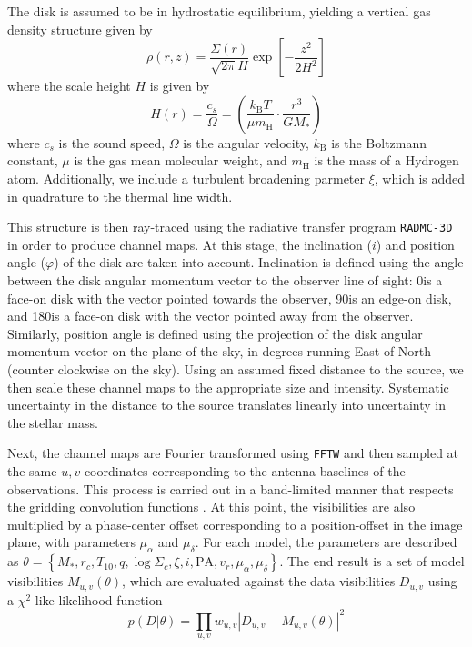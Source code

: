 \documentclass{aastex6}
\begin{document}
The disk is assumed to be in hydrostatic equilibrium, yielding a vertical gas density structure given by
\begin{equation}
\rho(r, z) = \frac{\Sigma(r)}{\sqrt{2 \pi} H} \exp \left [- \frac{z^2}{2 H^2} \right]
\end{equation}
where the scale height $H$ is given by
\begin{equation}
	H(r) = \frac{c_s}{\Omega} = \left (\frac{k_\mathrm{B} T}{\mu m_\mathrm{H}} \cdot \frac{r^3}{G M_\ast} \right)
\end{equation}
where $c_s$ is the sound speed, $\Omega$ is the angular velocity, $k_\mathrm{B}$ is the Boltzmann constant, $\mu$ is the gas mean molecular weight, and $m_\mathrm{H}$ is the mass of a Hydrogen atom. Additionally, we include a turbulent broadening parmeter $\xi$, which is added in quadrature to the thermal line width.

This structure is then ray-traced using the radiative transfer program \texttt{RADMC-3D} in order to produce channel maps. At this stage, the inclination ($i$) and position angle ($\varphi$) of the disk are taken into account. Inclination is defined using the angle between the disk angular momentum vector to the observer line of sight: 0\degr is a face-on disk with the vector pointed towards the observer, 90\degr is an edge-on disk, and 180\degr is a face-on disk with the vector pointed away from the observer. Similarly, position angle is defined using the projection of the disk angular momentum vector on the plane of the sky, in degrees running East of North (counter clockwise on the sky). Using an assumed fixed distance to the source, we then scale these channel maps to the appropriate size and intensity. Systematic uncertainty in the distance to the source translates linearly into uncertainty in the stellar mass.

Next, the channel maps are Fourier transformed using \texttt{FFTW} \citep{fftw} and then sampled at the same $u, v$ coordinates corresponding to the antenna baselines of the observations. This process is carried out in a band-limited manner that respects the gridding convolution functions \citep{schwab84}. At this point, the visibilities are also multiplied by a phase-center offset corresponding to a position-offset in the image plane, with parameters $\mu_\alpha$ and $\mu_\delta$. For each model, the parameters are described as $\theta = \left \{ M_\ast, r_c, T_{10}, q, \log \Sigma_c, \xi, i, \mathrm{PA}, v_r, \mu_\alpha, \mu_\delta \right \}$. The end result is a set of model visibilities $M_{u,v}(\theta)$, which are evaluated against the data visibilities $D_{u,v}$ using a $\chi^2$-like likelihood function
\begin{equation}
p(D | \theta) = \prod_{u,v} w_{u,v} \left | D_{u,v} - M_{u,v}(\theta) \right |^2
\end{equation}
\end{document}
